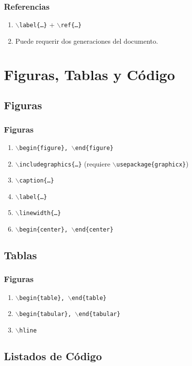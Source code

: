 \documentclass[a4paper,slidestop,xcolor=pst,dvips,blue]{beamer}
\newcommand{\command}[1]{\texttt{$\backslash$#1\{\dots\}}}
\newcommand{\singleCommand}[1]{\texttt{$\backslash$#1}}
\newcommand{\envCommand}[1]{\texttt{$\backslash$begin\{#1\}, $\backslash$end\{#1\}}}
\newcommand{\package}[1]{\texttt{$\backslash$usepackage\{#1\}}}
\begin{document}
\begin{frame}[c]
    \frametitle{Referencias}
    \begin{enumerate}
        \item \command{label} + \command{ref}
        \item Puede requerir dos generaciones del documento.
    \end{enumerate}
\end{frame}

\section{Figuras, Tablas y Código}

\subsection{Figuras}

\begin{frame}[c]
    \frametitle{Figuras}
    \begin{enumerate}[<+->]
        \item \envCommand{figure}
        \item \command{includegraphics} (requiere \package{graphicx})
        \item \command{caption}
        \item \command{label}
        \item \command{linewidth}
        \item \envCommand{center}
    \end{enumerate}
\end{frame}

\subsection{Tablas}

\begin{frame}[c]
    \frametitle{Figuras}
    \begin{enumerate}[<+->]
        \item \envCommand{table}
        \item \envCommand{tabular}
        \item \singleCommand{hline}
    \end{enumerate}
\end{frame}

\subsection{Listados de Código}
\end{document}
